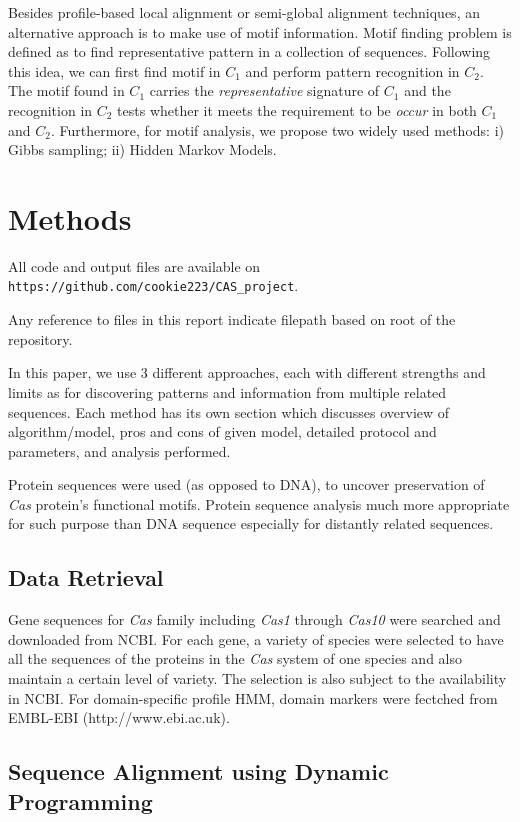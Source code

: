 \documentclass[11pt, oneside]{article}
\begin{document}
Besides profile-based local alignment or semi-global alignment techniques, an alternative approach is to make use of motif information. Motif finding problem is defined as to find representative pattern in a collection of sequences. Following this idea, we can first find motif in $C_1$ and perform pattern recognition in $C_2$. The motif found in $C_1$ carries the \textit{representative} signature of $C_1$ and the recognition in $C_2$ tests whether it meets the requirement to be \textit{occur} in both $C_1$ and $C_2$. Furthermore, for motif analysis, we propose two widely used methods: i) Gibbs sampling; ii) Hidden Markov Models. 

\section{Methods}

All code and output files are available on \texttt{https://github.com/cookie223/CAS\_project}. 

Any reference to files in this report indicate filepath based on root of the repository. 

In this paper, we use 3 different approaches, each with different strengths and limits as for discovering patterns and information from multiple related sequences. Each method has its own section which discusses overview of algorithm/model, pros and cons of given model, detailed protocol and parameters, and analysis performed. 

Protein sequences were used (as opposed to DNA), to uncover preservation of \textit{Cas} protein's functional motifs. Protein sequence analysis much more appropriate for such purpose than DNA sequence especially for distantly related sequences. 

\subsection{Data Retrieval}

Gene sequences for \textit{Cas} family including \textit{Cas1} through \textit{Cas10} were searched and downloaded from NCBI. For each gene, a variety of species were selected to have all the sequences of the proteins in the \textit{Cas} system of one species and also maintain a certain level of variety. The selection is also subject to the availability in NCBI. For domain-specific profile HMM, domain markers were fectched from EMBL-EBI (http://www.ebi.ac.uk). 

\subsection{Sequence Alignment using Dynamic Programming} \label{dpProtocol}
\end{document}
